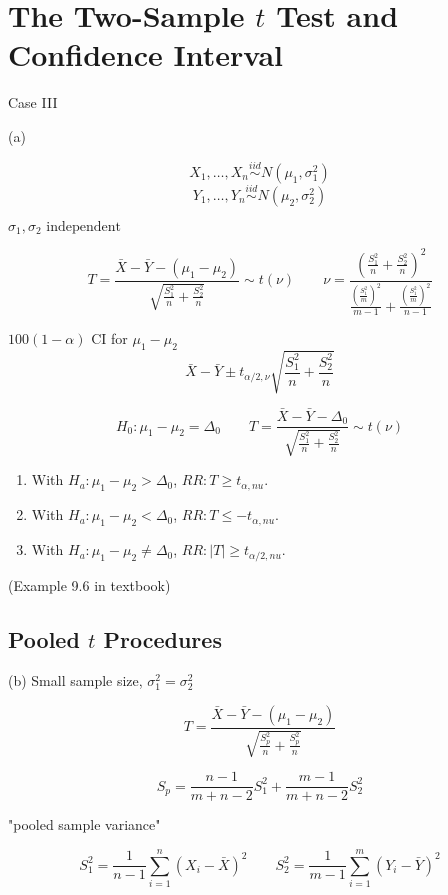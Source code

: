 \section{The Two-Sample $t$ Test and Confidence Interval}
Case III

(a) 

\[X_1,\dots,X_n \overset{iid}{\sim} N(\mu_1,\sigma_1^2)\]
\[Y_1,\dots,Y_n \overset{iid}{\sim} N(\mu_2,\sigma_2^2)\] 

$\sigma_1,\sigma_2 \text{ independent} $

\[T=\frac{\bar{X}-\bar{Y}-(\mu_1-\mu_2)}{\sqrt{\frac{S_1^2}{n}+\frac{S_2^2}{n}}} \sim t(\nu) \qquad \nu=\frac{\left( \frac{S_1^2}{n}+\frac{S_2^2}{n} \right)^2}{ \frac{\left( \frac{S_1^2}{m} \right)^2}{m-1}+ \frac{\left( \frac{S_1^2}{m} \right)^2}{n-1}  } \]

$100(1-\alpha)$ CI for $\mu_1-\mu_2$
\[\bar{X}-\bar{Y} \pm t_{\alpha/2,\nu} \sqrt{\frac{S_1^2}{n}+\frac{S_2^2}{n}}  \]

\[H_0:\mu_1-\mu_2=\Delta_0 \qquad T=\frac{\bar{X}-\bar{Y}-\Delta_0}{\sqrt{\frac{S_1^2}{n}+\frac{S_2^2}{n}}} \sim t(\nu)\]
\begin{enumerate}
\item With $H_a: \mu_1-\mu_2>\Delta_0$, $RR:T\geq t_{\alpha,nu}$.
\item With $H_a: \mu_1-\mu_2<\Delta_0$, $RR:T\leq -t_{\alpha,nu}$.
\item With $H_a: \mu_1-\mu_2\neq\Delta_0$, $RR:|T|\geq t_{\alpha/2,nu}$.
\end{enumerate}

\begin{exmp}
(Example 9.6 in textbook)
\end{exmp}

\subsection{Pooled $t$ Procedures}
(b) Small sample size, $\sigma_1^2=\sigma_2^2$

\[T=\frac{\bar{X}-\bar{Y}-(\mu_1-\mu_2)}{\sqrt{\frac{S_p^2}{n}+\frac{S_p^2}{n}}}\]

\[S_p=\frac{n-1}{m+n-2}S_1^2+\frac{m-1}{m+n-2}S_2^2\]

"pooled sample variance"

\[S_1^2=\frac{1}{n-1} \sum_{i=1}^n (X_i-\bar{X})^2 \qquad S_2^2=\frac{1}{m-1} \sum_{i=1}^m (Y_i-\bar{Y})^2 \]

